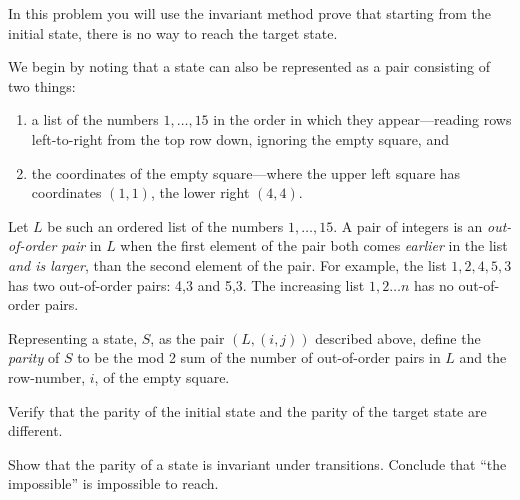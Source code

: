 \documentclass[handout]{mcs}
\begin{document}
\begin{problem}
In this problem you will use the invariant method prove that starting
from the initial state, there is no way to reach the target state.

We begin by noting that a state can also be represented as a pair
consisting of two things:
\begin{enumerate}

\item a list of the numbers $1,\dots,15$ in the order in which they
appear---reading rows left-to-right from the top row down, ignoring the
empty square, and

\item the coordinates of the empty square---where the upper left
square has coordinates $(1,1)$, the lower right $(4,4)$.

\end{enumerate}

Let $L$ be such an ordered list of the numbers $1,\dots,15$.  A pair of
integers is an \emph{out-of-order pair} in $L$ when the first element of
the pair both comes \emph{earlier} in the list \emph{and is larger}, than
the second element of the pair.  For example, the list $1,2,4,5,3$ has two
out-of-order pairs: 4,3 and 5,3.  The increasing list $1,2\dots n$ has no
out-of-order pairs.

Representing a state, $S$, as the pair $(L, (i,j))$ described above,
define the \emph{parity} of $S$ to be the mod 2 sum of the number of
out-of-order pairs in $L$ and the row-number, $i$, of the empty
square.

\begin{problemparts}

\problempart Verify that the parity of the initial state and the parity of the
target state are different.


\problempart Show that the parity of a state is invariant under transitions.
Conclude that ``the impossible'' is impossible to reach.

\end{problemparts}
\end{problem}
\end{document}
